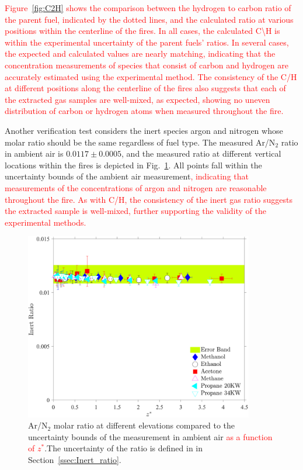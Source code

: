 \documentclass[12pt]{article}
\begin{document}
\textcolor{red}{Figure~\ref{fig:C2H} shows the comparison between the hydrogen to carbon ratio of the parent fuel, indicated by the dotted lines, and the calculated ratio at various positions within the centerline of the fires. In all cases, the calculated {C}\textbackslash{H} is within the experimental uncertainty of the parent fuels' ratios. In several cases, the expected and calculated values are nearly matching, indicating that the concentration measurements of species that consist of carbon and hydrogen are accurately estimated using the experimental method. The consistency of the {C}/{H} at different positions along the centerline of the fires also suggests that each of the extracted gas samples are well-mixed, as expected, showing no uneven distribution of carbon or hydrogen atoms when measured throughout the fire.}

Another verification test considers the inert species argon and nitrogen whose molar ratio should be the same regardless of fuel type. The measured Ar/N$_2$ ratio in ambient air is $0.0117\pm0.0005$, and the measured ratio at different vertical locations within the fires is depicted in Fig.~\ref{fig:IR}. All points fall within the uncertainty bounds of the ambient air measurement\textcolor{red}{, indicating that measurements of the concentrations of argon and nitrogen are reasonable throughout the fire. As with {C}/{H}, the consistency of the inert gas ratio suggests the extracted sample is well-mixed, further supporting the validity of the experimental methods.}

\begin{figure}[h!]
	\centering
\includegraphics[width=10.0cm, keepaspectratio]{Inert_ratio_Comparison.pdf}
	\caption[Ar/N$_2$ ratio within the fire envelop compared to ambient air]{Ar/N$_2$ molar ratio at different elevations compared to the uncertainty bounds of the measurement in ambient air \textcolor{red}{ as a function of $z^*$}.The uncertainty of the ratio is defined in in Section~\ref{ssec:Inert_ratio}.}
	\label{fig:IR}
\end{figure}
\clearpage
\end{document}
